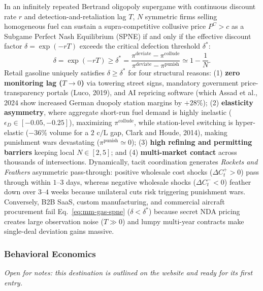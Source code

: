 \documentclass{article}
\begin{document}
In an infinitely repeated Bertrand oligopoly supergame with continuous discount rate $r$ and detection-and-retaliation lag $T$, $N$ symmetric firms selling homogeneous fuel can sustain a supra-competitive collusive price $P^C > c$ as a Subgame Perfect Nash Equilibrium (SPNE) if and only if the effective discount factor $\delta = \exp(-rT)$ exceeds the critical defection threshold $\delta^*$:
\begin{equation}
\delta = \exp(-rT) \ge \delta^* = \frac{\pi^{\text{deviate}} - \pi^{\text{collude}}}{\pi^{\text{deviate}} - \pi^{\text{punish}}} \simeq 1 - \frac{1}{N}.
\label{eq:mm-gas-spne}
\end{equation}
Retail gasoline uniquely satisfies $\delta \ge \delta^*$ for four structural reasons: (1) \textbf{zero monitoring lag ($T \to 0$)} via towering street signs, mandatory government price-transparency portals (Luco, 2019), and AI repricing software (which Assad et al., 2024 show increased German duopoly station margins by $+28\%$); (2) \textbf{elasticity asymmetry}, where aggregate short-run fuel demand is highly inelastic ($\epsilon_D \in [-0.05, -0.25]$), maximizing $\pi^{\text{collude}}$, while station-level switching is hyper-elastic ($-36\%$ volume for a $2\text{ c/L}$ gap, Clark and Houde, 2014), making punishment wars devastating ($\pi^{\text{punish}} \simeq 0$); (3) \textbf{high refining and permitting barriers} keeping local $N \in [2,5]$; and (4) \textbf{multi-market contact} across thousands of intersections. Dynamically, tacit coordination generates \textit{Rockets and Feathers} asymmetric pass-through: positive wholesale cost shocks ($\Delta C_t^+ > 0$) pass through within $1$--$3$ days, whereas negative wholesale shocks ($\Delta C_t^- < 0$) feather down over $3$--$4$ weeks because unilateral cuts risk triggering punishment wars. Conversely, B2B SaaS, custom manufacturing, and commercial aircraft procurement fail Eq.~\eqref{eq:mm-gas-spne} ($\delta < \delta^*$) because secret NDA pricing creates large observation noise ($T \gg 0$) and lumpy multi-year contracts make single-deal deviation gains massive.

\subsubsection{Behavioral Economics}\label{sec:behavioral-economics}
\textit{Open for notes: this destination is outlined on the website and ready for its first entry.}

\end{document}
